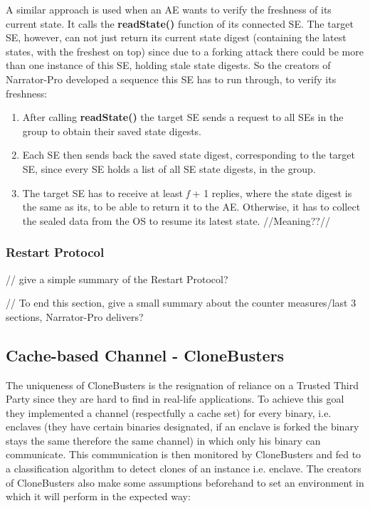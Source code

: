 A similar approach is used when an AE wants to verify the freshness of its current state. It calls the \textbf{readState()} function of its connected SE. The target SE, however, can not just return its current state digest (containing the latest states, with the freshest on top)
since due to a forking attack there could be more than one instance of this SE, holding stale state digests. So the creators of Narrator-Pro developed a sequence this SE has to run through, to verify its freshness:
\begin{enumerate}
    \item After calling \textbf{readState()} the target SE sends a request to all SEs in the group to obtain their saved state digests.
    \item Each SE then sends back the saved state digest, corresponding to the target SE, since every SE holds a list of all SE state digests, in the group.
    \item The target SE has to receive at least \textit{f} + 1 replies, where the state digest is the same as its, to be able to return it to the AE. Otherwise, it has to collect the sealed data from the OS to resume its latest state. //Meaning??//
\end{enumerate}


\subsubsection{Restart Protocol}



// give a simple summary of the Restart Protocol?


// To end this section, give a small summary about the counter measures/last 3 sections, Narrator-Pro delivers?


\subsection{Cache-based Channel - CloneBusters}

The uniqueness of CloneBusters is the resignation of reliance on a Trusted Third Party since they are hard to find in real-life applications. To achieve this goal they implemented a channel (respectfully a cache set) for every binary, i.e. enclaves (they have certain binaries designated, if an enclave is forked the binary stays the same therefore the same channel) in which only his binary can communicate. This communication is then monitored by CloneBusters and fed to a classification algorithm to detect clones of an instance i.e. enclave. The creators of CloneBusters also make some assumptions beforehand to set an environment in which it will perform in the expected way: 


